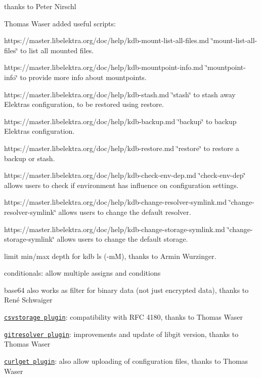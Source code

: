 \begin{DoxyItemize}
\begin{DoxyItemize}
\item thanks to Peter Nirschl
\end{DoxyItemize}
\item Thomas Waser added useful scripts\+:
\begin{DoxyItemize}
\item https\+://master.libelektra.\+org/doc/help/kdb-\/mount-\/list-\/all-\/files.md \char`\"{}mount-\/list-\/all-\/files\char`\"{} to list all mounted files.
\item https\+://master.libelektra.\+org/doc/help/kdb-\/mountpoint-\/info.md \char`\"{}mountpoint-\/info\char`\"{} to provide more info about mountpoints.
\item https\+://master.libelektra.\+org/doc/help/kdb-\/stash.md \char`\"{}stash\char`\"{} to stash away Elektra\textquotesingle{}s configuration, to be restored using {\ttfamily restore}.
\item https\+://master.libelektra.\+org/doc/help/kdb-\/backup.md \char`\"{}backup\char`\"{} to backup Elektra\textquotesingle{}s configuration.
\item https\+://master.libelektra.\+org/doc/help/kdb-\/restore.md \char`\"{}restore\char`\"{} to restore a backup or stash.
\item https\+://master.libelektra.\+org/doc/help/kdb-\/check-\/env-\/dep.md \char`\"{}check-\/env-\/dep\char`\"{} allows users to check if environment has influence on configuration settings.
\item https\+://master.libelektra.\+org/doc/help/kdb-\/change-\/resolver-\/symlink.md \char`\"{}change-\/resolver-\/symlink\char`\"{} allows users to change the default resolver.
\item https\+://master.libelektra.\+org/doc/help/kdb-\/change-\/storage-\/symlink.md \char`\"{}change-\/storage-\/symlink\char`\"{} allows users to change the default storage.
\end{DoxyItemize}
\item limit min/max depth for {\ttfamily kdb ls} ({\ttfamily -\/mM}), thanks to Armin Wurzinger.
\item conditionals\+: allow multiple assigns and conditions
\item base64 also works as filter for binary data (not just encrypted data), thanks to René Schwaiger
\item \href{https://www.libelektra.org/plugins/csvstorage}{\tt csvstorage plugin}\+: compatibility with R\+FC 4180, thanks to Thomas Waser
\item \href{https://www.libelektra.org/plugins/gitresolver}{\tt gitresolver plugin}\+: improvements and update of libgit version, thanks to Thomas Waser
\item \href{https://www.libelektra.org/plugins/curlget}{\tt curlget plugin}\+: also allow uploading of configuration files, thanks to Thomas Waser
\end{DoxyItemize}

